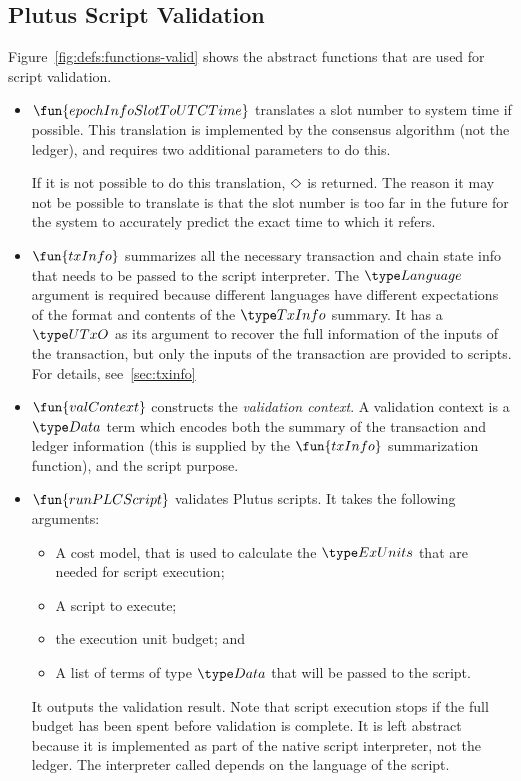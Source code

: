 \subsection{Plutus Script Validation}
Figure~\ref{fig:defs:functions-valid} shows the abstract functions that are used for script validation.

\begin{itemize}
\item $\fun{epochInfoSlotToUTCTime}$ translates a slot number to system time if possible.
This translation is implemented by the consensus algorithm (not the ledger), and requires
two additional parameters to do this.

If it is not possible to do this translation, $\Diamond$ is returned.
The reason it may not be possible to translate is that the slot number
is too far in the future for the system to accurately
predict the exact time to which it refers.

\item $\fun{txInfo}$ summarizes all the necessary transaction and chain state info
  that needs to be passed to the script interpreter. The $\Language$ argument
  is required because different languages have different expectations of the
  format and contents of the $\TxInfo$ summary.
  It has a $\UTxO$ as its argument to recover the full information of the inputs of the transaction,
  but only the inputs of the transaction are provided to scripts. For details, see~\ref{sec:txinfo}

\item
  $\fun{valContext}$ constructs the \emph{validation context}. A validation context is
  a $\Data$ term which encodes both the summary of the transaction and ledger information
  (this is supplied by the $\fun{txInfo}$ summarization function), and the script purpose.

\item
  $\fun{runPLCScript}$ validates Plutus scripts. It takes the following
  arguments:
  \begin{itemize}
  \item A cost model, that is used to calculate the $\ExUnits$ that are needed for script execution;
  \item A script to execute;
  \item the execution unit budget; and
  \item A list of terms of type $\Data$ that will be passed to the script.
  \end{itemize}
  It outputs the validation result.
  Note that script execution stops if the full budget has been spent before validation is complete.
  It is left abstract because it is implemented as part of the native script interpreter, not the ledger.
  The interpreter called depends on the language of the script.
\end{itemize}


